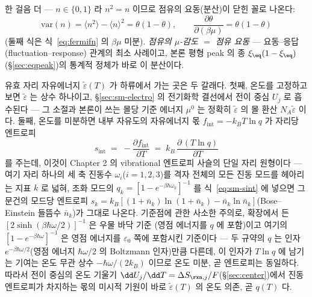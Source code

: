 한 걸음 더 --- $n\in\{0,1\}$ 라 $n^2=n$ 이므로 점유의 요동(분산)이 닫힌 꼴로 나온다:
\begin{equation}
\mathrm{var}(n)=\langle n^2\rangle-\langle n\rangle^2=\theta(1-\theta),
\qquad
\frac{\partial\theta}{\partial(\beta\mu)}=\theta(1-\theta)
\label{eq:sm-flucres}
\end{equation}
(둘째 식은 식~\eqref{eq:fermifn} 의 $\beta\mu$ 미분). \emph{점유의 $\mu$-감도 $=$ 점유 요동} --- 요동--응답
(fluctuation--response) 관계의 최소 사례이고, 본론 평형 peak 의 종 $\xi_\eq(1-\xi_\eq)$(\S\ref{sec:eqpeak})의
통계적 정체가 바로 이 분산이다.

유효 자리 자유에너지 $\tilde\varepsilon(T)$ 가 하류에서 가는 곳은 두 갈래다. 첫째, 온도를 고정하고 보면
$\tilde\varepsilon$ 는 상수 하나이고, \S\ref{sec:sm-electro} 의 전기화학 결선에서 전이 중심 $U_j$ 로
흡수된다 --- 그 소절과 본론이 쓰는 몰당 기준 에너지 $\mu^0$ 는 정확히 $\tilde\varepsilon$ 의 몰 환산
$N_A\tilde\varepsilon$ 이다. 둘째, 온도를 미분하면 내부 자유도의 자유에너지 몫
$f_\mathrm{int}=-k_BT\ln q$ 가 자리당 엔트로피
\begin{equation}
s_\mathrm{int}\;=\;-\frac{\partial f_\mathrm{int}}{\partial T}
\;=\;k_B\,\frac{\partial\,(T\ln q)}{\partial T}
\label{eq:sm-sint}
\end{equation}
를 주는데, 이것이 Chapter 2 의 vibrational 엔트로피 사슬의 단일 자리 원형이다 --- 여기 자리 하나의
세 축 진동수 $\omega_i$($i=1,2,3$)를 격자 전체의 모든 진동 모드를 헤아리는 지표 $k$ 로 넓혀, 조화 모드의
$q_k=[1-e^{-\beta\hbar\omega_k}]^{-1}$ 를 식~\eqref{eq:sm-sint} 에 넣으면 그 문건의 모드당 엔트로피
$s_k=k_B[(1+\bar n_k)\ln(1+\bar n_k)-\bar n_k\ln\bar n_k]$(Bose--Einstein 들뜸수 $\bar n_k$)가 그대로
나온다. 기준점에 관한 사소한 주의로, 확장에서 든 $[2\sinh(\beta\hbar\omega/2)]^{-1}$ 은 우물 바닥 기준
(영점 에너지를 $q$ 에 포함)이고 여기의 $[1-e^{-\beta\hbar\omega}]^{-1}$ 은 영점 에너지를
$\varepsilon_0$ 쪽에 포함시킨 기준이다 --- 두 규약의 $q$ 는 인자 $e^{-\beta\hbar\omega/2}$(영점 에너지
$\hbar\omega/2$ 의 Boltzmann 인자)만큼 다른데, 이 인자가 $T\ln q$ 에 남기는 기여는 온도 무관 상수
$-\hbar\omega/(2k_B)$ 이므로 온도 미분, 곧 엔트로피는 동일하다. 따라서 전이 중심의 온도 기울기
$\dd U_j/\dd T=\Delta S_{\rxn,j}/F$(\S\ref{sec:center})에서 진동
엔트로피가 차지하는 몫의 미시적 기원이 바로 $\tilde\varepsilon(T)$ 의 온도 의존, 곧 $q(T)$ 다.

